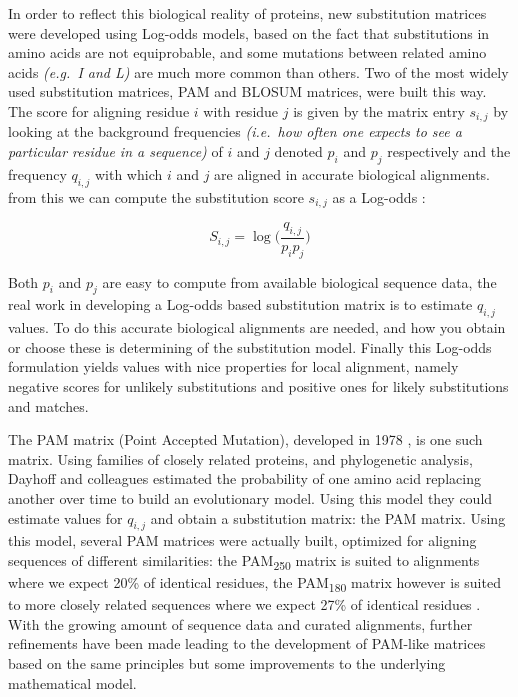 \documentclass[
  11pt,
  twoside]{scrbook}
\begin{document}
In order to reflect this biological reality of proteins, new substitution matrices were developed using Log-odds models, based on the fact that substitutions in amino acids are not equiprobable, and some mutations between related amino acids \emph{(e.g.~I and L)} are much more common than others. Two of the most widely used substitution matrices, PAM and BLOSUM matrices, were built this way. The score for aligning residue \(i\) with residue \(j\) is given by the matrix entry \(s_{i,j}\) by looking at the background frequencies \emph{(i.e.~how often one expects to see a particular residue in a sequence)} of \(i\) and \(j\) denoted \(p_i\) and \(p_j\) respectively and the frequency \(q_{i,j}\) with which \(i\) and \(j\) are aligned in accurate biological alignments. from this we can compute the substitution score \(s_{i,j}\) as a Log-odds \autocite{altschulSubstitutionMatrices2013}:

\[
S_{i,j}=\log\bigg(\frac{q_{i,j}}{p_ip_j}\bigg)
\]

Both \(p_i\) and \(p_j\) are easy to compute from available biological sequence data, the real work in developing a Log-odds based substitution matrix is to estimate \(q_{i,j}\) values. To do this accurate biological alignments are needed, and how you obtain or choose these is determining of the substitution model. Finally this Log-odds formulation yields values with nice properties for local alignment, namely negative scores for unlikely substitutions and positive ones for likely substitutions and matches.

The PAM matrix (Point Accepted Mutation), developed in 1978 \autocite{dayhoffModelEvolutionaryChange1978}, is one such matrix. Using families of closely related proteins, and phylogenetic analysis, Dayhoff and colleagues estimated the probability of one amino acid replacing another over time to build an evolutionary model. Using this model they could estimate values for \(q_{i,j}\) and obtain a substitution matrix: the PAM matrix. Using this model, several PAM matrices were actually built, optimized for aligning sequences of different similarities: the PAM\textsubscript{250} matrix is suited to alignments where we expect 20\% of identical residues, the PAM\textsubscript{180} matrix however is suited to more closely related sequences where we expect 27\% of identical residues \autocite{altschulSubstitutionMatrices2013}. With the growing amount of sequence data and curated alignments, further refinements have been made leading to the development of PAM-like matrices based on the same principles \autocite{mullerModelingAminoAcid2000} but some improvements to the underlying mathematical model.
\end{document}
